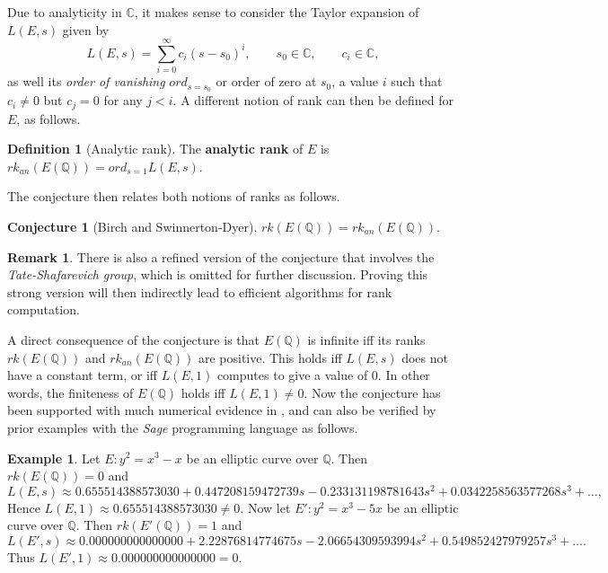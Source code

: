 \documentclass{article}
\newcommand{\Q}{\mathbb{Q}}
\newcommand{\C}{\mathbb{C}}
\newcommand{\rb}[1]{\left( #1 \right)}
\theoremstyle{definition}\newtheorem*{definition}{Definition}
\theoremstyle{definition}\newtheorem*{example}{Example}
\theoremstyle{definition}\newtheorem*{remark}{Remark}
\newtheorem{conjecture}[proposition]{Conjecture}
\begin{document}
Due to analyticity in $ \C $, it makes sense to consider the Taylor expansion of $ L\rb{E, s} $ given by
$$ L\rb{E, s} = \sum_{i = 0}^\infty c_i\rb{s - s_0}^i, \qquad s_0 \in \C, \qquad c_i \in \C, $$
as well its \emph{order of vanishing} $ ord_{s = s_0} $ or order of zero at $ s_0 $, a value $ i $ such that $ c_i \ne 0 $ but $ c_j = 0 $ for any $ j < i $. A different notion of rank can then be defined for $ E $, as follows.

\begin{definition}[Analytic rank]
The \textbf{analytic rank} of $ E $ is $ rk_{an}\rb{E\rb{\Q}} = ord_{s = 1}L\rb{E, s} $.
\end{definition}

The conjecture then relates both notions of ranks as follows.

\begin{conjecture}[Birch and Swinnerton-Dyer] $ rk\rb{E\rb{\Q}} = rk_{an}\rb{E\rb{\Q}} $.
\end{conjecture}

\begin{remark}
There is also a refined version of the conjecture that involves the \emph{Tate-Shafarevich group}, which is omitted for further discussion. Proving this strong version will then indirectly lead to efficient algorithms for rank computation.
\end{remark}

A direct consequence of the conjecture is that $ E\rb{\Q} $ is infinite iff its ranks $ rk\rb{E\rb{\Q}} $ and $ rk_{an}\rb{E\rb{\Q}} $ are positive. This holds iff $ L\rb{E, s} $ does not have a constant term, or iff $ L\rb{E, 1} $ computes to give a value of $ 0 $. In other words, the finiteness of $ E\rb{\Q} $ holds iff $ L\rb{E, 1} \ne 0 $. Now the conjecture has been supported with much numerical evidence in \cite{bsd0}, and can also be verified by prior examples with the \emph{Sage} programming language as follows.

\begin{example}
Let $ E : y^2 = x^3 - x $ be an elliptic curve over $ \Q $. Then $ rk\rb{E\rb{\Q}} = 0 $ and
$$ L\rb{E, s} \approx 0.655514388573030 + 0.447208159472739s - 0.233131198781643s^2 + 0.0342258563577268s^3 + \dots, $$
Hence $ L\rb{E, 1} \approx 0.655514388573030 \ne 0 $. Now let $ E' : y^2 = x^3 - 5x $ be an elliptic curve over $ \Q $. Then $ rk\rb{E'\rb{\Q}} = 1 $ and
$$ L\rb{E', s} \approx 0.000000000000000 + 2.22876814774675s - 2.06654309593994s^2 + 0.549852427979257s^3 + \dots. $$
Thus $ L\rb{E', 1} \approx 0.000000000000000 = 0 $.
\end{example}
\end{document}
